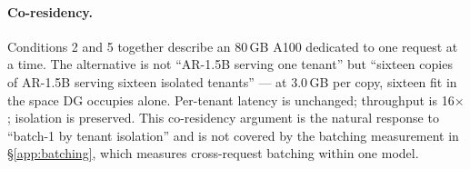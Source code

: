 \paragraph{Co-residency.}
Conditions 2 and 5 together describe an 80\,GB A100 dedicated to one
request at a time. The alternative is not ``AR-1.5B serving one tenant''
but ``sixteen copies of AR-1.5B serving sixteen isolated tenants'' --- at
3.0\,GB per copy, sixteen fit in the space DG occupies alone. Per-tenant
latency is unchanged; throughput is 16$\times$; isolation is preserved.
This co-residency argument is the natural response to ``batch-1 by tenant
isolation'' and is not covered by the batching measurement in
\S\ref{app:batching}, which measures cross-request batching within one
model.
